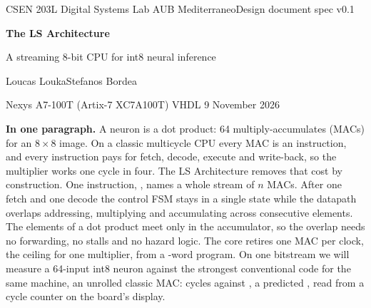 \begin{titlepage}
\thispagestyle{empty}
{\sffamily\small\color{lsgrey}CSEN 203L Digital Systems Lab \textperiodcentered{} AUB Mediterraneo\hfill Design document \textperiodcentered{} spec v0.1\par}
\vspace{16mm}
\begin{center}\end{center}
\vspace{12mm}
{\sffamily\fontsize{40}{44}\selectfont\bfseries\color{lsnavy}The LS Architecture\par}
\vspace{5mm}
{\sffamily\LARGE\color{lsamber}A streaming 8-bit CPU for int8 neural inference\par}
\vspace{11mm}
{\Large Loucas Louka\quad\textperiodcentered\quad Stefanos Bordea\par}
\vspace{2.5mm}
{\color{lsgrey}Nexys A7-100T (Artix-7 XC7A100T) \textperiodcentered{} VHDL \textperiodcentered{} 9 November 2026\par}
\vfill
\begin{tcolorbox}[lsbase,breakable=false,colback=lspaper,borderline west={3pt}{0pt}{lsamber}]
\small\textbf{In one paragraph.} A neuron is a dot product: 64 multiply-accumulates (MACs) for an 8\,$\times$\,8 image. On a classic multicycle CPU every MAC is an instruction, and every instruction pays for fetch, decode, execute and write-back, so the multiplier works one cycle in four. The LS Architecture removes that cost by construction. One instruction, , names a whole stream of $n$ MACs. After one fetch and one decode the control FSM stays in a single  state while the datapath overlaps addressing, multiplying and accumulating across consecutive elements. The elements of a dot product meet only in the accumulator, so the overlap needs no forwarding, no stalls and no hazard logic. The core retires one MAC per clock, the ceiling for one multiplier, from a \wdS-word program. On one bitstream we will measure a 64-input int8 neuron against the strongest conventional code for the same machine, an unrolled classic MAC: \pred{\cycS} cycles against \pred{\cycU}, a predicted \pred{\ratioUS$\times$}, read from a cycle counter on the board's display.
\end{tcolorbox}
\restoregeometry
\end{titlepage}
